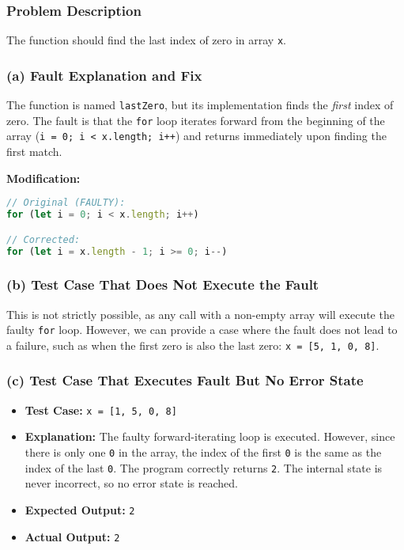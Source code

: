 \documentclass[11pt,a4paper]{article}
\begin{document}
\subsubsection{Problem Description}
The function should find the last index of zero in array \texttt{x}.

\subsubsection{(a) Fault Explanation and Fix}

 The function is named \texttt{lastZero}, but its implementation finds the \textit{first} index of zero. The fault is that the \texttt{for} loop iterates forward from the beginning of the array (\texttt{i = 0; i < x.length; i++}) and returns immediately upon finding the first match.

\textbf{Modification:}
\begin{lstlisting}[language=JavaScript]
// Original (FAULTY):
for (let i = 0; i < x.length; i++)

// Corrected:
for (let i = x.length - 1; i >= 0; i--)
\end{lstlisting}

\subsubsection{(b) Test Case That Does Not Execute the Fault}

This is not strictly possible, as any call with a non-empty array will execute the faulty \texttt{for} loop. However, we can provide a case where the fault does not lead to a failure, such as when the first zero is also the last zero: \texttt{x = [5, 1, 0, 8]}.

\subsubsection{(c) Test Case That Executes Fault But No Error State}

\begin{itemize}[leftmargin=*]
    \item \textbf{Test Case:} \texttt{x = [1, 5, 0, 8]}
    \item \textbf{Explanation:} The faulty forward-iterating loop is executed. However, since there is only one \texttt{0} in the array, the index of the first \texttt{0} is the same as the index of the last \texttt{0}. The program correctly returns \texttt{2}. The internal state is never incorrect, so no error state is reached.
    \item \textbf{Expected Output:} \texttt{2}
    \item \textbf{Actual Output:} \texttt{2}
\end{itemize}
\end{document}
